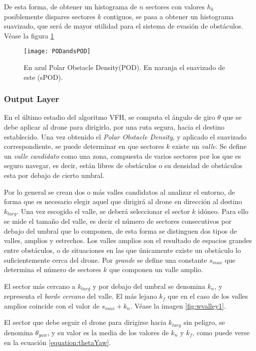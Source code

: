 De esta forma, de obtener un histograma de $n$ sectores con valores $h_k$ posiblemente dispares sectores $k$ contiguos, se pasa a obtener un histograma suavizado, que será de mayor utilidad para el sistema de evasión de obstáculos. Véase la figura \ref{fig:PODandsPOD}

 \begin{figure}[H]
	\centering
	\texttt{[image: PODandsPOD]}
	\caption{En azul Polar Obstacle Density(POD). En naranja el suavizado de este (sPOD).}\label{fig:PODandsPOD}
\end{figure}

\subsubsection{Output Layer}
\label{subsubsec:OL}
En el último estadio del algoritmo VFH, se computa el ángulo de giro $\theta$ que se debe aplicar al drone para dirigirlo, por una ruta segura, hacia el destino establecido.
Una vez obtenido el \textit{Polar Obstacle Density}, y aplicado el suavizado correspondiente, se puede determinar en que sectores $k$ existe un \textit{valle}. Se define un \textit{valle candidato} como una zona, compuesta de varios sectores por los que es seguro navegar, es decir, están libres de obstáculos o su densidad de obstáculos esta por debajo de cierto umbral. 

Por lo general se crean dos o más valles candidatos al analizar el entorno, de forma que es necesario elegir aquel que dirigirá al drone en dirección al destino $k_{targ}$. Una vez escogido el valle, se deberá seleccionar el sector $k$ idóneo. Para ello se mide el tamaño del valle, es decir el número de sectores consecutivos por debajo del umbral que lo componen, de esta forma se distinguen dos tipos de valles, amplios y estrechos. 
Los valles amplios son el resultado de espacios grandes entre obstáculos, o de situaciones en las que únicamente existe un obstáculo lo suficientemente cerca del drone. Por \textit{grande} se define una constante $s_{max}$ que determina el número de sectores $k$ que componen un valle amplio.

El sector más cercano a $k_{targ}$ y por debajo del umbral se denomina $k_n$, y representa el \textit{borde cercano} del valle. El más lejano $k_f$ que en el caso de los valles amplios coincide con el valor de $s_{max} + k_n$.  Véase la imagen \ref{fig:wvalley1}.

El sector que debe seguir el drone para dirigirse hacia $k_{targ}$ sin peligro, se denomina $\theta_{yaw}$, y su valor es la media de los valores de $k_n$ y $k_f$, como puede verse en la ecuación \ref{equation:thetaYaw}.

